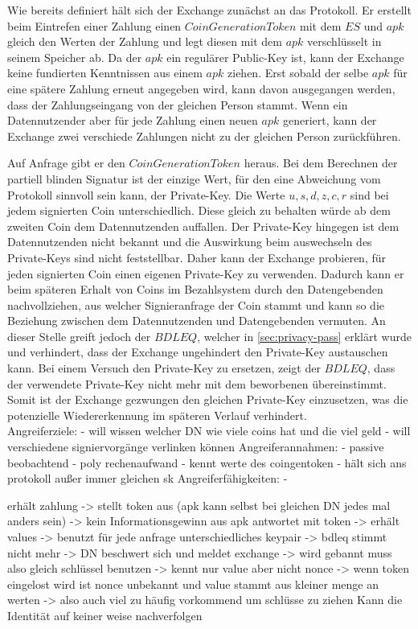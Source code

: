 \documentclass{scrreprt}
\begin{document}
Wie bereits definiert hält sich der Exchange zunächst an das Protokoll. Er erstellt beim Eintrefen einer Zahlung einen $CoinGenerationToken$ mit dem $ES$ und $apk$ gleich den Werten der Zahlung und legt diesen mit dem $apk$ verschlüsselt in seinem Speicher ab. Da der $apk$ ein regulärer Public-Key ist, kann der Exchange keine fundierten Kenntnissen aus einem $apk$ ziehen. Erst sobald der selbe $apk$ für eine spätere Zahlung erneut angegeben wird, kann davon ausgegangen werden, dass der Zahlungseingang von der gleichen Person stammt. Wenn ein Datennutzender aber für jede Zahlung einen neuen $apk$ generiert, kann der Exchange zwei verschiede Zahlungen nicht zu der gleichen Person zurückführen.

Auf Anfrage gibt er den $CoinGenerationToken$ heraus. Bei dem Berechnen der partiell blinden Signatur ist der einzige Wert, für den eine Abweichung vom Protokoll sinnvoll sein kann, der Private-Key. Die Werte $u,s,d,z,c,r$ sind bei jedem signierten Coin unterschiedlich. Diese gleich zu behalten würde ab dem zweiten Coin dem Datennutzenden auffallen. Der Private-Key hingegen ist dem Datennutzenden nicht bekannt und die Auswirkung beim auswechseln des Private-Keys sind nicht feststellbar. Daher kann der Exchange probieren, für jeden signierten Coin einen eigenen Private-Key zu verwenden. Dadurch kann er beim späteren Erhalt von Coins im Bezahlsystem durch den Datengebenden nachvollziehen, aus welcher Signieranfrage der Coin stammt und kann so die Beziehung zwischen dem Datennutzenden und Datengebenden vermuten. An dieser Stelle greift jedoch der $BDLEQ$, welcher in \ref{sec:privacy-pass} erklärt wurde und verhindert, dass der Exchange ungehindert den Private-Key austauschen kann. Bei einem Versuch den Private-Key zu ersetzen, zeigt der $BDLEQ$, dass der verwendete Private-Key nicht mehr mit dem beworbenen übereinstimmt. Somit ist der Exchange gezwungen den gleichen Private-Key einzusetzen, was die potenzielle Wiedererkennung im späteren Verlauf verhindert.\\




Angreiferziele:
    - will wissen welcher DN wie viele coins hat und die viel geld
    - will verschiedene signiervorgänge verlinken können
Angreiferannahmen:
    - passive beobachtend
    - poly rechenaufwand
    - kennt werte des coingentoken
    - hält sich ans protokoll außer immer gleichen sk
Angreiferfähigkeiten:
    -

erhält zahlung -> stellt token aus (apk kann selbst bei gleichen DN jedes mal anders sein) -> kein Informationsgewinn aus apk
antwortet mit token -> erhält values -> benutzt für jede anfrage unterschiedliches keypair -> bdleq stimmt nicht mehr -> DN beschwert sich und meldet exchange -> wird gebannt
muss also gleich schlüssel benutzen -> kennt nur value aber nicht nonce -> wenn token eingelost wird ist nonce unbekannt und value stammt aus kleiner menge an werten -> also auch viel zu häufig vorkommend um schlüsse zu ziehen
Kann die Identität auf keiner weise nachverfolgen
\end{document}
